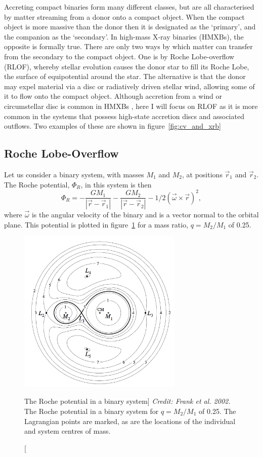 Accreting compact binaries form many different classes, 
but are all characterised by matter streaming from a donor
onto a compact object. When the compact object is more massive 
than the donor then it is designated as the `primary', 
and the companion as the `secondary'. 
In high-mass X-ray binaries (HMXBs), the opposite is formally true.
There are only two ways by which matter can transfer 
from the secondary to the compact object. One is by Roche Lobe-overflow (RLOF),
whereby stellar evolution causes the donor star to fill its Roche Lobe, the surface
of equipotential around the star. The alternative is that the donor may expel
material via a disc or radiatively driven stellar wind, 
allowing some of it to flow onto the compact object. 
Although accretion from a wind or circumstellar disc is common in 
HMXBs \citep{bartlett2013}, here I will focus on 
RLOF as it is more common in the systems that possess high-state accretion discs
and associated outflows. Two examples of these are shown in figure~\ref{fig:cv_and_xrb}


\subsection{Roche Lobe-Overflow}

Let us consider a binary system, with masses $M_1$ and $M_2$, at positions
$\vec{r}_1$ and $\vec{r}_2$. The Roche potential, $\Phi_R$, in this system 
is then
\begin{equation}
\Phi_R = - \frac{GM_1}{| \vec{r} - \vec{r}_1 |} - 
\frac{GM_2}{| \vec{r} - \vec{r}_2 |} - 1/2 (\vec{\omega} \times
 \vec{r})^2,
\label{eq:roche}
\end{equation} 
where $\vec{\omega}$ is the angular velocity of the binary and is a vector normal to
the orbital plane. This potential is plotted in figure~\ref{fig:roche} for a mass ratio, 
$q = M_2 / M_1$ of 0.25.

\begin{figure}
\centering
\includegraphics[width=0.7\textwidth]{figures/01-intro/roche_potential.png}
\caption
[The Roche potential in a binary system]
{
{\sl Credit: Frank et al. 2002.} 
The Roche potential in a binary system for $q = M_2 / M_1$ of 0.25.
The Lagrangian points are marked, as are the locations of the individual
and system centres of mass.
} 
\label{fig:roche}
\end{figure}

